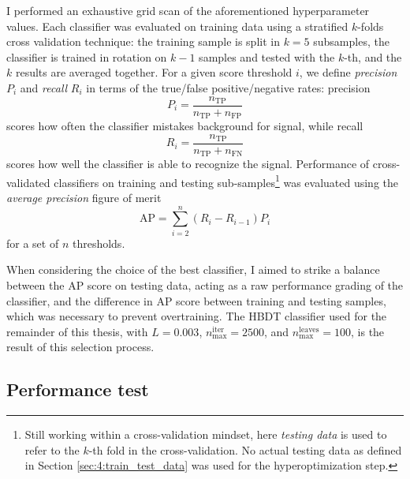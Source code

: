 I performed an exhaustive grid scan of the aforementioned hyperparameter values.
Each classifier was evaluated on training data using a stratified $k$-folds cross validation technique: the training sample is split in $k=5$ subsamples, the classifier is trained in rotation on $k-1$ samples and tested with the $k$-th, and the $k$ results are averaged together.
For a given score threshold $i$, we define \textit{precision} $P_i$ and \textit{recall} $R_i$ in terms of the true/false positive/negative rates: precision 
\begin{equation}
	P_i = \frac{n_\text{TP}}{n_\text{TP} + n_\text{FP}}
	\label{eq:4:precision}
\end{equation}
scores how often the classifier mistakes background for signal, while recall
\begin{equation}
	R_i = \frac{n_\text{TP}}{n_\text{TP} + n_\text{FN}}
	\label{eq:4:recall}
\end{equation}
scores how well the classifier is able to recognize the signal.
Performance of cross-validated classifiers on training and testing sub-samples\footnote{Still working within a cross-validation mindset, here \textit{testing data} is used to refer to the $k$-th fold in the cross-validation. No actual testing data as defined in Section \ref{sec:4:train_test_data} was used for the hyperoptimization step.} was evaluated using the \textit{average precision} figure of merit
\begin{equation}
	\text{AP} = \sum_{i=2}^{n} (R_i - R_{i-1})P_i
	\label{eq:4:average_prec}
\end{equation}
for a set of $n$ thresholds.

When considering the choice of the best classifier, I aimed to strike a balance between the AP score on testing data, acting as a raw performance grading of the classifier, and the difference in AP score between training and testing samples, which was necessary to prevent overtraining.
The HBDT classifier used for the remainder of this thesis, with $L=0.003$, $n_\text{max}^\text{iter}=2500$, and $n_\text{max}^\text{leaves}=100$, is the result of this selection process.

\subsection{Performance test}

